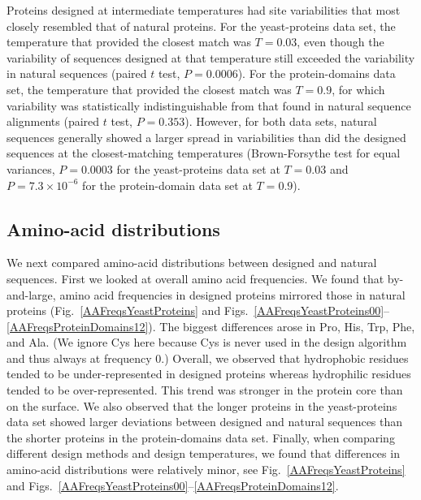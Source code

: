 \documentclass[12pt]{article}
\begin{document}
Proteins designed at intermediate temperatures had site variabilities that most closely resembled that of natural proteins. For the yeast-proteins data set, the temperature that provided the closest match was $T=0.03$, even though the variability of sequences designed at that temperature still exceeded the variability in natural sequences (paired $t$ test, $P= 0.0006$). For the protein-domains data set, the temperature that provided the closest match was $T=0.9$, for which variability was statistically indistinguishable from that found in natural sequence alignments (paired $t$ test, $P= 0.353$). However, for both data sets, natural sequences generally showed a larger spread in variabilities than did the designed sequences at the closest-matching temperatures (Brown-Forsythe test for equal variances, $P= 0.0003$ for the yeast-proteins data set at $T = 0.03$  and $P= 7.3\times 10^{-6}$ for the protein-domain data set at $T = 0.9$).

\subsection{Amino-acid distributions}
\label{AminoAcidDistributions}

We next compared amino-acid distributions between designed and natural sequences. First we looked at overall amino acid frequencies. We found that by-and-large, amino acid frequencies in designed proteins mirrored those in natural proteins (Fig.~\ref{AAFreqsYeastProteins} and Figs.~\ref{AAFreqsYeastProteins00}--\ref{AAFreqsProteinDomains12}). The biggest differences arose in Pro, His, Trp, Phe, and Ala. (We ignore Cys here because Cys is never used in the design algorithm and thus always at frequency 0.) Overall, we observed that hydrophobic residues tended to be under-represented in designed proteins whereas hydrophilic residues tended to be over-represented. This trend was stronger in the protein core than on the surface. We also observed that the longer proteins in the yeast-proteins data set showed larger deviations between designed and natural sequences than the shorter proteins in the protein-domains data set. Finally, when comparing different design methods and design temperatures, we found that differences in amino-acid distributions were relatively minor, see Fig.~\ref{AAFreqsYeastProteins} and Figs.~\ref{AAFreqsYeastProteins00}--\ref{AAFreqsProteinDomains12}.
\end{document}

